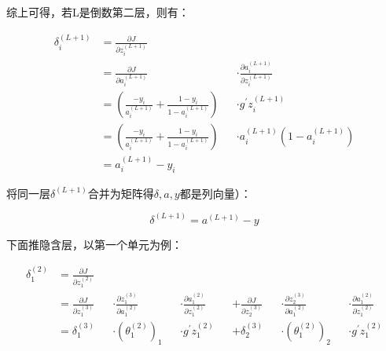 \documentclass{article}
\begin{document}
综上可得，若L是倒数第二层，则有：

\begin{corollary}[误差$\delta$定义]
    \[\begin{aligned}
            \delta_i^{\left(L+1\right)}
             & =\frac{\partial J}{\partial z_i^{\left(L+1\right)}}                                      \\
             & =\frac{\partial J}{\partial a_i^{\left(L+1\right)}}
             &
             & \cdot\frac{\partial a_i^{\left(L+1\right)}}{\partial z_i^{\left(L+1\right)}}             \\
             & =\left(\frac{-y_i}{a_i^{\left(L+1\right)}}+\frac{1-y_i}{1-a_i^{\left(L+1\right)}}\right)
             &
             & \cdot g^\prime z_i^{\left(L+1\right)}                                                    \\
             & =\left(\frac{-y_i}{a_i^{\left(L+1\right)}}+\frac{1-y_i}{1-a_i^{\left(L+1\right)}}\right)
             &
             & \cdot a_i^{\left(L+1\right)}\left(1-a_i^{\left(L+1\right)}\right)                        \\
             & =a_i^{\left(L+1\right)}-y_i
        \end{aligned}\]
\end{corollary}

将同一层$\delta^{\left(L+1\right)}$合并为矩阵得$\delta,a,y$都是列向量）：

\[\delta^{\left(L+1\right)}=a^{\left(L+1\right)}-y\]

下面推隐含层，以第一个单元为例：

\[\begin{aligned}
        \delta_1^{\left(2\right)}
         & =\frac{\partial J}{\partial z_1^{\left(2\right)}}                        \\
         & =\frac{\partial J}{\partial z_1^{\left(3\right)}}
         &
         & \cdot\frac{\partial z_1^{\left(3\right)}}{\partial a_1^{\left(2\right)}}
         &
         & \cdot\frac{\partial a_1^{\left(2\right)}}{\partial z_1^{\left(2\right)}}
         &
         & +\frac{\partial J}{\partial z_2^{\left(3\right)}}
         &
         & \cdot\frac{\partial z_2^{\left(3\right)}}{\partial a_1^{\left(2\right)}}
         &
         & \cdot\frac{\partial a_1^{\left(2\right)}}{\partial z_1^{\left(2\right)}} \\
         & =\delta_1^{\left(3\right)}
         &
         & \cdot\left(\theta_1^{\left(2\right)}\right)_1
         &
         & \cdot g^\prime z_1^{\left(2\right)}
         &
         & +\delta_2^{\left(3\right)}
         &
         & \cdot\left(\theta_1^{\left(2\right)}\right)_2
         &
         &
        \cdot g^\prime z_1^{\left(2\right)}
    \end{aligned}\]
\end{document}
